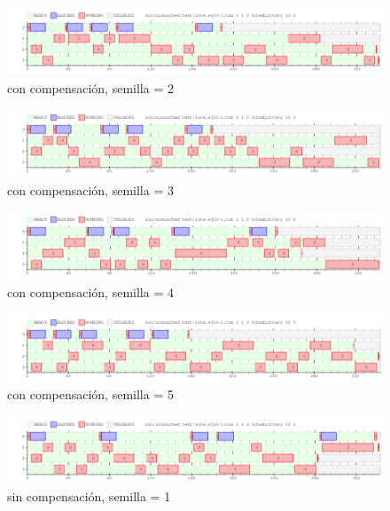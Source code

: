 \documentclass[a4paper]{article}
\begin{document}
\begin{figure}[H]
\begin{center}
\includegraphics[scale=0.4]{imagenes/ej10-1-c-s-2.png}
\end{center}
\caption{con compensación, semilla = 2}
\end{figure}

\begin{figure}[H]
\begin{center}
\includegraphics[scale=0.4]{imagenes/ej10-1-c-s-3.png}
\end{center}
\caption{con compensación, semilla = 3}
\end{figure}

\begin{figure}[H]
\begin{center}
\includegraphics[scale=0.4]{imagenes/ej10-1-c-s-4.png}
\end{center}
\caption{con compensación, semilla = 4}
\end{figure}

\begin{figure}[H]
\begin{center}
\includegraphics[scale=0.4]{imagenes/ej10-1-c-s-5.png}
\end{center}
\caption{con compensación, semilla = 5}
\end{figure}

\begin{figure}[H]
\begin{center}
\includegraphics[scale=0.4]{imagenes/ej10-1-s-s-1.png}
\end{center}
\caption{sin compensación, semilla = 1}
\end{figure}
\end{document}
